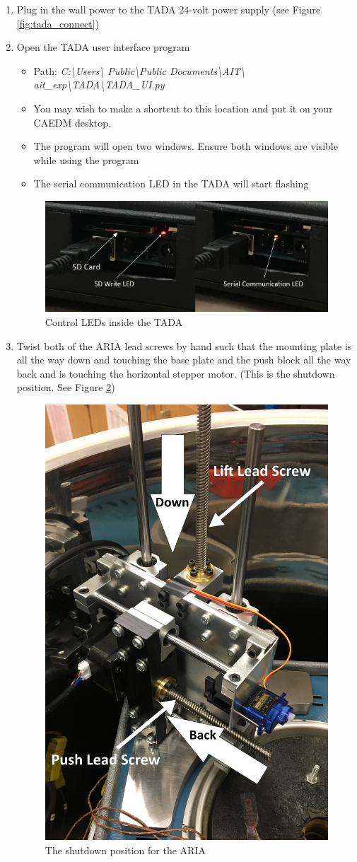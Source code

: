 \documentclass[letterpaper,11pt]{article}
\begin{document}
\begin{enumerate}
    \item Plug in the wall power to the TADA 24-volt power supply (see Figure 
        \ref{fig:tada_connect})

    \item Open the TADA user interface program
            \begin{itemize}
            \item Path: \textit{C:\textbackslash Users\textbackslash  
                Public\textbackslash Public Documents\textbackslash AIT\textbackslash 
                ait\_exp\textbackslash TADA\textbackslash TADA\_UI.py}
            \item You may wish to make a shortcut to this location and put it on 
                your CAEDM desktop.
            \item The program will open two windows. Ensure both windows are 
                visible while using the program
            \item The serial communication LED in the TADA will start flashing
            \end{itemize}

\begin{figure}[H]
    \centering
    \includegraphics[width=.75\textwidth]{led_red_yellow.jpg}
    \caption{Control LEDs inside the TADA}
    \label{fig:tada_leds}
\end{figure}

    \item Twist both of the ARIA lead screws by hand such that the mounting 
        plate is all the way down and touching the base plate and the push block
        all the way back and is touching the horizontal stepper motor. (This is 
        the shutdown position. See Figure \ref{fig:shutdown_position})

\begin{figure}[H]
\centering\includegraphics[width=.3\textwidth]{shutdown_position.jpg}
\caption{The shutdown position for the ARIA}
\label{fig:shutdown_position}
\end{figure}


\end{enumerate}
\end{document}
